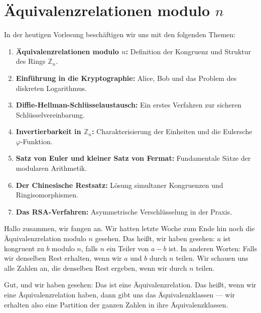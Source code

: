 


\section{Äquivalenzrelationen modulo \texorpdfstring{$n$}{n}}

\begin{nice-box}
In der heutigen Vorlesung beschäftigen wir uns mit den folgenden Themen:
\begin{enumerate}[label=\textbf{(\arabic*)}]
    \item \textbf{Äquivalenzrelationen modulo $n$:} Definition der Kongruenz und Struktur des Rings $\mathbb{Z}_n$.
    \item \textbf{Einführung in die Kryptographie:} Alice, Bob und das Problem des diskreten Logarithmus.
    \item \textbf{Diffie-Hellman-Schlüsselaustausch:} Ein erstes Verfahren zur sicheren Schlüsselvereinbarung.
    \item \textbf{Invertierbarkeit in $\mathbb{Z}_n$:} Charakterisierung der Einheiten und die Eulersche $\varphi$-Funktion.
    \item \textbf{Satz von Euler und kleiner Satz von Fermat:} Fundamentale Sätze der modularen Arithmetik.
    \item \textbf{Der Chinesische Restsatz:} Lösung simultaner Kongruenzen und Ringisomorphismen.
    \item \textbf{Das RSA-Verfahren:} Asymmetrische Verschlüsselung in der Praxis.
\end{enumerate}
\end{nice-box}

\begin{spoken-clean}[00:00:00 - 00:01:08]
Hallo zusammen, wir fangen an. Wir hatten letzte Woche zum Ende hin noch die Äquivalenzrelation modulo $n$ gesehen.  Das heißt, wir haben gesehen: $a$ ist kongruent zu $b$ modulo $n$, falls $n$ ein Teiler von $a - b$ ist. In anderen Worten: Falls wir denselben Rest erhalten, wenn wir $a$ und $b$ durch $n$ teilen. Wir schauen uns alle Zahlen an, die denselben Rest ergeben, wenn wir durch $n$ teilen.

Gut, und wir haben gesehen: Das ist eine Äquivalenzrelation. Das heißt, wenn wir eine Äquivalenzrelation haben, dann gibt uns das Äquivalenzklassen --- wir erhalten also eine Partition der ganzen Zahlen in ihre Äquivalenzklassen.
\end{spoken-clean}

